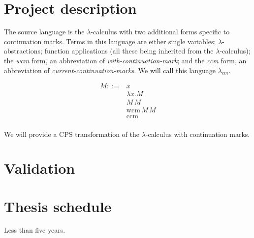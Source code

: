 \documentclass[ms]{byuprop}
\begin{document}
\section{Project description}

The source language is the $\lambda$-calculus with two additional forms specific to continuation 
marks. Terms in this language are either single variables; $\lambda$-abstractions; function 
applications (all these being inherited from the $\lambda$-calculus); the \emph{wcm} form, an 
abbreviation of \emph{with-continuation-mark}; and the \emph{ccm} form, an abbreviation of 
\emph{current-continuation-marks}. We will call this language $\lambda_{cm}$.

\begin{align*}
M ::= &x\\
      &\lambda x.M\\
      &M\,M\\
      &\mathrm{wcm}\,M\,M\\
      &\mathrm{ccm}\\
\end{align*}

We will provide a CPS transformation of the $\lambda$-calculus with continuation marks.

\section{Validation}

\section{Thesis schedule}

Less than five years.





\end{document}
